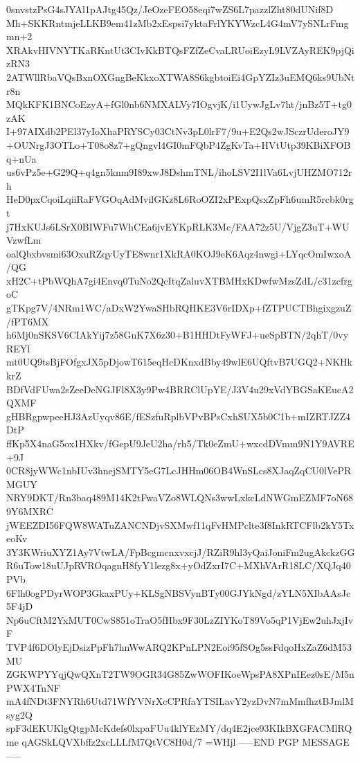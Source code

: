 0snvstzPsG4sJYAl1pAJtg45Qz/JeOzeFEO58eqi7wZS6L7pazzlZht80dUNif8D
Mh+SKKRntmjeLLKB9em41zMb2xEspsi7yktaFrlYKYWzcL4G4mV7ySNLrFmgmn+2
XRAkvHIVNYTKaRKntUt3CIvKkBTQsFZfZeCvaLRUoiEzyL9LVZAyREK9pjQizRN3
2ATWllRbaVQsBxnOXGngBeKkxoXTWA8S6kgbtoiEi4GpYZIz3uEMQ6ks9UbNtr8n
MQkKFK1BNCoEzyA+fGl0nb6NMXALVy7IOgvjK/i1UywJgLv7ht/jnBz5T+tg0zAK
I+97AIXdb2PEl37yIoXhaPRYSCy03CtNv3pL0lrF7/9u+E2Qs2wJSczrUderoJY9
+OUNrgJ3OTLo+T08o8z7+gQngvl4GI0mFQbP4ZgKvTa+HVtUtp39KBiXFOBq+nUa
us6vPz5e+G29Q+q4gn5knm9I89xwJ8DshmTNL/ihoLSV2I1lVa6LvjUHZMO712rh
HeD0pxCqoiLqiiRaFVGOqAdMvilGKz8L6RoOZI2xPExpQsxZpFh6umR5rcbk0rgt
j7HxKUJs6LSrX0BIWFu7WhCEa6jvEYKpRLK3Mc/FAA72z5U/VjgZ3uT+WUVzwfLm
oalQbxbvsmi63OxuRZqyUyTE8wnr1XkRA0KOJ9eK6Aqz4nwgi+LYqcOmIwxoA/QG
xH2C+tPbWQhA7gi4Envq0TuNo2QcItqZaluvXTBMHxKDwfwMzsZdL/c31zcfrgoC
gTKpg7V/4NRm1WC/aDxW2YwaSHbRQHKE3V6rIDXp+fZTPUCTBhgixgzuZ/fPT6MX
h6Mj0nSKSV6CIAkYij7z58GnK7X6z30+B1HHDtFyWFJ+ueSpBTN/2qhT/0vyREYl
mt0UQ9tsBjFOfgxJX5pDjowT615eqHcDKnxdBby49wlE6UQftvB7UGQ2+NKHkkrZ
BDfVdFUwa2sZeeDeNGJFl8X3y9Pw4BRRClUpYE/J3V4u29xVdYBGSaKEucA2QXMF
gHBRgpwpeeHJ3AzUyqv86E/fESzfuRplbVPvBPsCxhSUX5b0C1b+mIZRTJZZ4DtP
ffKp5X4naG5ox1HXkv/fGepU9JeU2ha/rh5/Tk0eZmU+wxcdDVmm9N1Y9AVRE+9J
0CR8jyWWc1nbIUv3hnejSMTY5eG7LcJHHm06OB4WnSLcs8XJaqZqCU0lVePRMGUY
NRY9DKT/Rn3baq489M14K2tFwaVZo8WLQNs3wwLxkcLdNWGmEZMF7oN689Y6MXRC
jWEEZDI56FQW8WATuZANCNDjvSXMwf11qFvHMPclte3f8InkRTCFlb2kY5TxeoKv
3Y3KWriuXYZ1Ay7VtwLA/FpBcgmcnxvxcjJ/RZiR9hl3yQaiJoniFm2ugAkckzGG
R6uTow18uUJpRVROqagnH8fyY1lezg8x+yOdZxrI7C+MXhVArR18LC/XQJq40PVb
6Flh0ogPDyrWOP3GkaxPUy+KLSgNBSVynBTy00GJYkNgd/zYLN5XIbAAsJc5F4jD
Np6uCftM2YxMUT0CwS851oTraO5fHbx9F30LzZIYKoT89Vo5qP1VjEw2uhJxjIvF
TVP4f6DOlyEjDsizPpFh7hnWwARQ2KPnLPN2Eoi95fSOg5ssFdqoHxZaZ6dM53MU
ZGKWPYYqjQwQXnT2TW9OGR34G85ZwWOFIKoeWpsPA8XPnIEez0sE/M5nPWX4TnNF
mA4fNDt3FNYRh6Utd71WfYVNrXcCPRfaYTSILavY2yzDvN7mMmfhztBJmlMsyg2Q
spF3dEKUKlgQtgpMcKdefs0lxpaFUu4klYEzMY/dq4E2jce93KIkBXGFACMlRQme
qAGSkLQVXbffz2xcLLLfM7QtVC8H0d/7
=WHjl
-----END PGP MESSAGE-----
